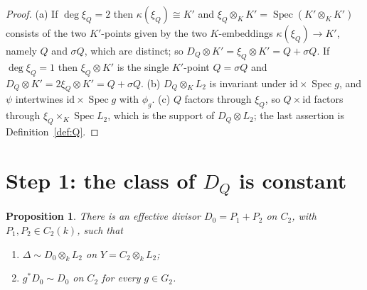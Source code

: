 \documentclass[11pt]{amsart}
\newtheorem{proposition}[theorem]{Proposition}
\theoremstyle{definition}
\theoremstyle{remark}
\newcommand{\Spec}{\operatorname{Spec}}
\begin{document}
\begin{proof}
(a) If $\deg\xi_Q=2$ then $\kappa(\xi_Q)\cong K'$ and $\xi_Q\otimes_KK'=\Spec(K'\otimes_KK')$
consists of the two $K'$-points given by the two $K$-embeddings $\kappa(\xi_Q)\to K'$,
namely $Q$ and $\sigma Q$, which are distinct; so $D_Q\otimes K'=\xi_Q\otimes K'=Q+\sigma Q$.
If $\deg\xi_Q=1$ then $\xi_Q\otimes K'$ is the single $K'$-point $Q=\sigma Q$ and
$D_Q\otimes K'=2\xi_Q\otimes K'=Q+\sigma Q$. (b) $D_Q\otimes_KL_2$ is invariant under
$\mathrm{id}\times\Spec g$, and $\psi$ intertwines $\mathrm{id}\times\Spec g$ with
$\phi_g$. (c) $Q$ factors through $\xi_Q$, so $Q\times\mathrm{id}$ factors through
$\xi_Q\times_K\Spec L_2$, which is the support of $D_Q\otimes L_2$; the last assertion is
Definition~\ref{def:Q}.
\end{proof}

\section{Step 1: the class of \texorpdfstring{$D_Q$}{D\_Q} is constant}\label{sec:step1}

\begin{proposition}\label{prop:step1}
There is an effective divisor $D_0=P_1+P_2$ on $C_2$, with $P_1,P_2\in C_2(k)$, such that
\begin{enumerate}[label=\textup{(\alph*)}]
\item $\Delta\sim D_0\otimes_kL_2$ on $Y=C_2\otimes_kL_2$;
\item $g^*D_0\sim D_0$ on $C_2$ for every $g\in G_2$.
\end{enumerate}
\end{proposition}
\end{document}
